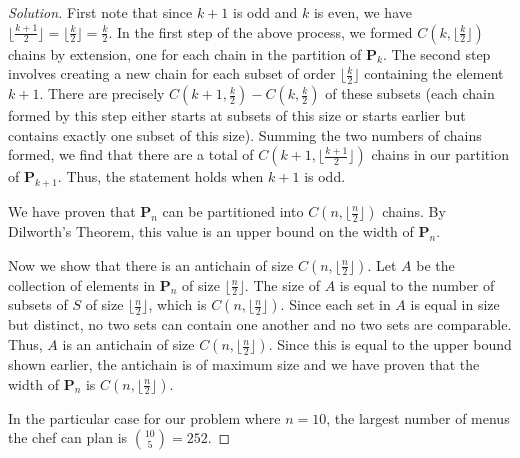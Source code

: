\documentclass[12pt]{article}
\theoremstyle{definition}
\newenvironment{solution}{
  \begin{proof}[Solution]
    \vspace{-8px}
    \setlength{\parskip}{4px}
    \setlength{\parindent}{0px}
}{
\end{proof}
}
\begin{document}
\begin{solution}
    First note that since \(k+1\) is odd and \(k\) is even, we have \(\lfloor{\frac{k+1}{2}}\rfloor = \lfloor{\frac{k}{2}}\rfloor = \frac{k}{2}\). In the first step of the above process, we formed \(C\left(k, \lfloor{\frac{k}{2}}\rfloor\right)\) chains by extension, one for each chain in the partition of \(\textbf{P}_{k}\). The second step involves creating a new chain for each subset of order \(\lfloor{\frac{k}{2}}\rfloor\) containing the element \(k+1\). There are precisely \(C\left(k+1, \frac{k}{2}\right) - C\left(k, \frac{k}{2}\right)\) of these subsets (each chain formed by this step either starts at subsets of this size or starts earlier but contains exactly one subset of this size). Summing the two numbers of chains formed, we find that there are a total of \(C\left(k+1, \lfloor{\frac{k+1}{2}}\rfloor\right)\) chains in our partition of \(\textbf{P}_{k+1}\). Thus, the statement holds when \(k+1\) is odd.

    We have proven that \(\textbf{P}_{n}\) can be partitioned into \(C\left(n, \lfloor{\frac{n}{2}}\rfloor\right)\) chains. By Dilworth's Theorem, this value is an upper bound on the width of \(\textbf{P}_{n}\).

    Now we show that there is an antichain of size \(C\left(n, \lfloor{\frac{n}{2}}\rfloor\right)\). Let \(A\) be the collection of elements in \(\textbf{P}_{n}\) of size \(\lfloor{\frac{n}{2}}\rfloor\). The size of \(A\) is equal to the number of subsets of \(S\) of size \(\lfloor{\frac{n}{2}}\rfloor\), which is \(C\left(n, \lfloor{\frac{n}{2}}\rfloor\right)\). Since each set in \(A\) is equal in size but distinct, no two sets can contain one another and no two sets are comparable. Thus, \(A\) is an antichain of size \(C\left(n, \lfloor{\frac{n}{2}}\rfloor\right)\). Since this is equal to the upper bound shown earlier, the antichain is of maximum size and we have proven that the width of \(\textbf{P}_{n}\) is \(C\left(n, \lfloor{\frac{n}{2}}\rfloor\right)\).

    In the particular case for our problem where \(n = 10\), the largest number of menus the chef can plan is \({10 \choose 5} = 252\).


\end{solution}
\end{document}
